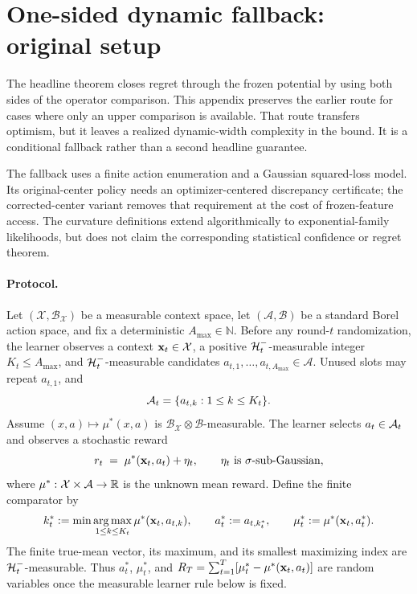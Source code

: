 \section{One-sided dynamic fallback: original setup}
\label{app:one-sided-fallback}\label{sec:problem}
The headline theorem closes regret through the frozen potential by using both
sides of the operator comparison.  This appendix preserves the earlier route
for cases where only an upper comparison is available.  That route transfers
optimism, but it leaves a realized dynamic-width complexity in the bound.  It
is a conditional fallback rather than a second headline guarantee.

The fallback uses a finite action enumeration and a Gaussian squared-loss
model.  Its original-center policy needs an optimizer-centered discrepancy
certificate; the corrected-center variant removes that requirement at the cost
of frozen-feature access.  The curvature definitions extend algorithmically to
exponential-family likelihoods, but  does not claim the
corresponding statistical confidence or regret theorem.

\paragraph{Protocol.}
Let $(\mathcal X,\mathcal B_{\mathcal X})$ be a measurable context space, let
$(\mathcal A,\mathcal B)$ be a standard Borel action space, and fix a
deterministic $A_{\max}\in\mathbb N$.  Before any round-$t$ randomization,
the learner observes a context $\mathbf{x}_t\in\mathcal X$, a positive
$\mathcal{H}_t^-$-measurable integer $K_t\le A_{\max}$, and
$\mathcal{H}_t^-$-measurable candidates
$a_{t,1},\ldots,a_{t,A_{\max}}\in\mathcal A$.  Unused slots may repeat
$a_{t,1}$, and
\[
 \mathcal{A}_t=\{a_{t,k}:1\le k\le K_t\}.
\]
Assume $(x,a)\mapsto\mu^*(x,a)$ is
$\mathcal B_{\mathcal X}\otimes\mathcal B$-measurable.  The learner selects
$a_t\in\mathcal{A}_t$ and observes a stochastic reward
\begin{equation}\label{eq:reward}
  r_t \;=\; \mu^*(\mathbf{x}_t, a_t) + \eta_t, \qquad
  \eta_t \text{ is } \sigma\text{-sub-Gaussian},
\end{equation}
where $\mu^*:\mathcal{X}\times\mathcal{A}\to\mathbb{R}$ is the unknown mean reward.
Define the finite comparator by
\[
 k_t^*:=\min\operatorname*{arg\,max}_{1\le k\le K_t}
       \mu^*(\mathbf{x}_t,a_{t,k}),\qquad
 a_t^*:=a_{t,k_t^*},\qquad
 \mu_t^*:=\mu^*(\mathbf{x}_t,a_t^*).
\]
The finite true-mean vector, its maximum, and its smallest maximizing index are
$\mathcal{H}_t^-$-measurable.  Thus $a_t^*$, $\mu_t^*$, and
$R_T=\sum_{t=1}^T[\mu_t^*-\mu^*(\mathbf{x}_t,a_t)]$ are random variables once the
measurable learner rule below is fixed.

